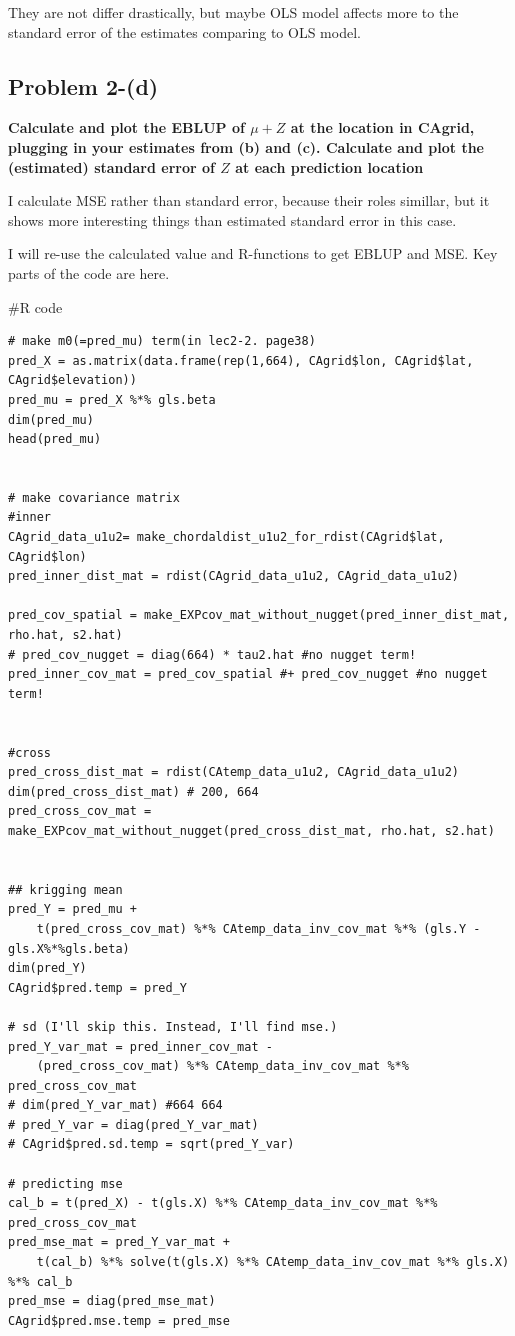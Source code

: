 \documentclass{article}
\newenvironment{Rcode}%
{%
    \begin{mdframed}
    \#R code
    \begin{small}
}
{%
    \end{small}
    \end{mdframed}
}
\begin{document}
They are not differ drastically, but maybe OLS model affects more to the standard error of the estimates comparing to OLS model.


\clearpage
\subsection{Problem 2-(d)}
\textbf{
Calculate and plot the EBLUP of $\mu+Z$ at the location in CAgrid,
plugging in your estimates from (b) and (c).
Calculate and plot the (estimated) standard error of $Z$ at each prediction location
}

I calculate MSE rather than standard error, because their roles simillar,
but it shows more interesting things than estimated standard error in this case.

I will re-use the calculated value and R-functions to get EBLUP and MSE.
Key parts of the code are here.


\begin{Rcode}
    \begin{verbatim}
# make m0(=pred_mu) term(in lec2-2. page38)
pred_X = as.matrix(data.frame(rep(1,664), CAgrid$lon, CAgrid$lat, CAgrid$elevation))
pred_mu = pred_X %*% gls.beta
dim(pred_mu)
head(pred_mu)


# make covariance matrix
#inner
CAgrid_data_u1u2= make_chordaldist_u1u2_for_rdist(CAgrid$lat, CAgrid$lon)
pred_inner_dist_mat = rdist(CAgrid_data_u1u2, CAgrid_data_u1u2)

pred_cov_spatial = make_EXPcov_mat_without_nugget(pred_inner_dist_mat, rho.hat, s2.hat)
# pred_cov_nugget = diag(664) * tau2.hat #no nugget term!
pred_inner_cov_mat = pred_cov_spatial #+ pred_cov_nugget #no nugget term!


#cross
pred_cross_dist_mat = rdist(CAtemp_data_u1u2, CAgrid_data_u1u2)
dim(pred_cross_dist_mat) # 200, 664
pred_cross_cov_mat = make_EXPcov_mat_without_nugget(pred_cross_dist_mat, rho.hat, s2.hat)


## krigging mean
pred_Y = pred_mu + 
    t(pred_cross_cov_mat) %*% CAtemp_data_inv_cov_mat %*% (gls.Y - gls.X%*%gls.beta)
dim(pred_Y)
CAgrid$pred.temp = pred_Y

# sd (I'll skip this. Instead, I'll find mse.)
pred_Y_var_mat = pred_inner_cov_mat - 
    (pred_cross_cov_mat) %*% CAtemp_data_inv_cov_mat %*% pred_cross_cov_mat
# dim(pred_Y_var_mat) #664 664
# pred_Y_var = diag(pred_Y_var_mat)
# CAgrid$pred.sd.temp = sqrt(pred_Y_var)

# predicting mse
cal_b = t(pred_X) - t(gls.X) %*% CAtemp_data_inv_cov_mat %*% pred_cross_cov_mat
pred_mse_mat = pred_Y_var_mat + 
    t(cal_b) %*% solve(t(gls.X) %*% CAtemp_data_inv_cov_mat %*% gls.X) %*% cal_b
pred_mse = diag(pred_mse_mat)
CAgrid$pred.mse.temp = pred_mse
    \end{verbatim}
\end{Rcode}
\end{document}
